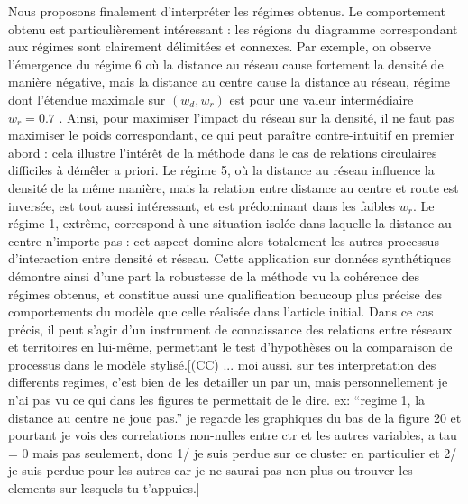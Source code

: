{}{
Nous proposons finalement d'interpréter les régimes obtenus. Le comportement obtenu est particulièrement intéressant : les régions du diagramme correspondant aux régimes sont clairement délimitées et connexes. Par exemple, on observe l'émergence du régime 6 où la distance au réseau cause fortement la densité de manière négative, mais la distance au centre cause la distance au réseau, régime dont l'étendue maximale sur $(w_d,w_r)$ est pour une valeur intermédiaire $w_r=0.7$ . Ainsi, pour maximiser l'impact du réseau sur la densité, il ne faut pas maximiser le poids correspondant, ce qui peut paraître contre-intuitif en premier abord : cela illustre l'intérêt de la méthode dans le cas de relations circulaires difficiles à démêler a priori. Le régime 5, où la distance au réseau influence la densité de la même manière, mais la relation entre distance au centre et route est inversée, est tout aussi intéressant, et est prédominant dans les faibles $w_r$. Le régime 1, extrême, correspond à une situation isolée dans laquelle la distance au centre n'importe pas : cet aspect domine alors totalement les autres processus d'interaction entre densité et réseau. Cette application sur données synthétiques démontre ainsi d'une part la robustesse de la méthode vu la cohérence des régimes obtenus, et constitue aussi une qualification beaucoup plus précise des comportements du modèle que celle réalisée dans l'article initial. Dans ce cas précis, il peut s'agir d'un instrument de connaissance des relations entre réseaux et territoires en lui-même, permettant le test d'hypothèses ou la comparaison de processus dans le modèle stylisé.[(CC) ... moi aussi. sur tes interpretation des differents regimes, c'est bien de les detailler un par un, mais personnellement je n'ai pas vu ce qui dans les figures te permettait de le dire. ex: ``regime 1, la distance au centre ne joue pas.'' je regarde les graphiques du bas de la figure 20 et pourtant je vois des correlations non-nulles entre ctr et les autres variables, a tau = 0 mais pas seulement, donc 1/ je suis perdue sur ce cluster en particulier et 2/ je suis perdue pour les autres car je ne saurai pas non plus ou trouver les elements sur lesquels tu t'appuies.]
}



